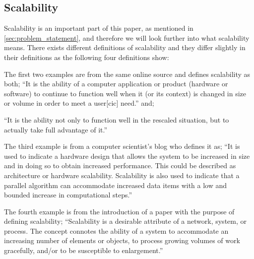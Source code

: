 \subsection{Scalability}\label{subsec:scalability}
Scalability is an important part of this paper, as mentioned in \cref{sec:problem_statement}, and therefore we will look further into what scalability means.
There exists different definitions of scalability and they differ slightly in their definitions as the following four definitions show:

The first two examples are from the same online source and defines scalability as both;
``It is the ability of a computer application or product (hardware or software) to continue to function well when it (or its context) is changed in size or volume in order to meet a user[cic] need.''
and;

``It is the ability not only to function well in the rescaled situation, but to actually take full advantage of it.''
\cite{scaleDef1}

The third example is from a computer scientist's blog who defines it as;
``It is used to indicate a hardware design that allows the system to be increased in size and in doing so to obtain increased performance. This could be described as architecture or hardware scalability. Scalability is also used to indicate that a parallel algorithm can accommodate increased data items with a low and bounded increase in computational steps.''
\cite{scaleDef2}

The fourth example is from the introduction of a paper with the purpose of defining scalability;
``Scalability is a desirable attribute of a network, system, or
process. The concept connotes the ability of a system to
accommodate an increasing number of elements or objects, to
process growing volumes of work gracefully, and/or to be
susceptible to enlargement.''
\cite{scaleDef3}

